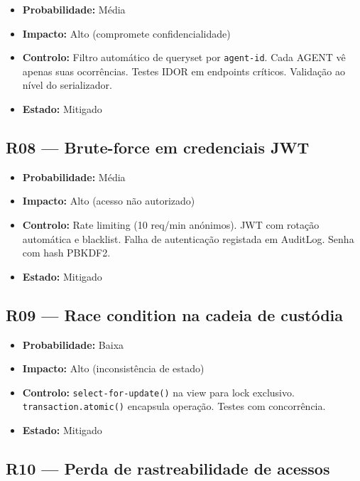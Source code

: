\documentclass[a4paper,11pt]{article}
\begin{document}
\begin{itemize}[nosep]
    \item \textbf{Probabilidade:} Média
    \item \textbf{Impacto:} Alto (compromete confidencialidade)
    \item \textbf{Controlo:} Filtro automático de queryset por \texttt{agent-id}.
          Cada AGENT vê apenas suas ocorrências. Testes IDOR em endpoints críticos.
          Validação ao nível do serializador.
    \item \textbf{Estado:} Mitigado
\end{itemize}

\subsection*{R08 — Brute-force em credenciais JWT}

\begin{itemize}[nosep]
    \item \textbf{Probabilidade:} Média
    \item \textbf{Impacto:} Alto (acesso não autorizado)
    \item \textbf{Controlo:} Rate limiting (10 req/min anónimos). JWT com rotação
          automática e blacklist. Falha de autenticação registada em AuditLog.
          Senha com hash PBKDF2.
    \item \textbf{Estado:} Mitigado
\end{itemize}

\subsection*{R09 — Race condition na cadeia de custódia}

\begin{itemize}[nosep]
    \item \textbf{Probabilidade:} Baixa
    \item \textbf{Impacto:} Alto (inconsistência de estado)
    \item \textbf{Controlo:} \texttt{select-for-update()} na view para lock
          exclusivo. \texttt{transaction.atomic()} encapsula operação. Testes com
          concorrência.
    \item \textbf{Estado:} Mitigado
\end{itemize}

\subsection*{R10 — Perda de rastreabilidade de acessos}
\end{document}
